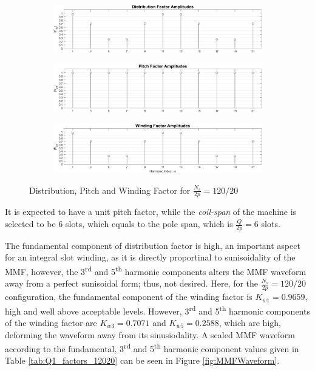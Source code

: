 \documentclass[a4paper, 11pt]{article}
\begin{document}
\begin{figure}[h!]
    \centering
    \begin{subfigure}[b]{1.00\textwidth}
        \includegraphics[width=\textwidth]{Q1_distributionFactor.png}
        \caption{}
        \label{subfig:Q1_dist_factor}
    \end{subfigure}
    \begin{subfigure}[b]{1.00\textwidth}
        \includegraphics[width=\textwidth]{Q1_pitchFactor.png}
        \caption{}
        \label{subfig:Q1_pitch_factor}
    \end{subfigure}
    \begin{subfigure}[b]{1.00\textwidth}
        \includegraphics[width=\textwidth]{Q1_windingFactor.png}
        \caption{}
        \label{subfig:Q1_wind_factor}
    \end{subfigure}
    \caption{Distribution, Pitch and Winding Factor for $\frac{N_s}{2p}=120/20$}
    \label{fig:Q1_factors_12020}
\end{figure}


It is expected to have a unit pitch factor, while the \textit{coil-span} of the machine is selected to be 6 slots, which equals to the pole span, which is $\frac{Q}{2p}=6$  slots.

The fundamental component of distribution factor is high, an important aspect for an integral slot winding, as it is directly proportinal to sunisoidality of the MMF, however, the 3\textsuperscript{rd} and 5\textsuperscript{th} harmonic components alters the MMF waveform away from a perfect sunisoidal form; thus, not desired. Here, for the $\frac{N_s}{2p}=120/20$ configuration, the fundamental component of the winding factor is $K_{w1} =0.9659$, high and well above acceptable levels. However, 3\textsuperscript{rd} and 5\textsuperscript{th} harmonic components of the winding factor are $K_{w3} =0.7071$ and $K_{w5} =0.2588$, which are high, deforming the waveform away from its sinusiodality. A scaled MMF waveform according to the fundamental, 3\textsuperscript{rd} and 5\textsuperscript{th} harmonic component values given in Table \ref{tab:Q1_factors_12020} can be seen in Figure \ref{fig:MMFWaveform}.
\end{document}
